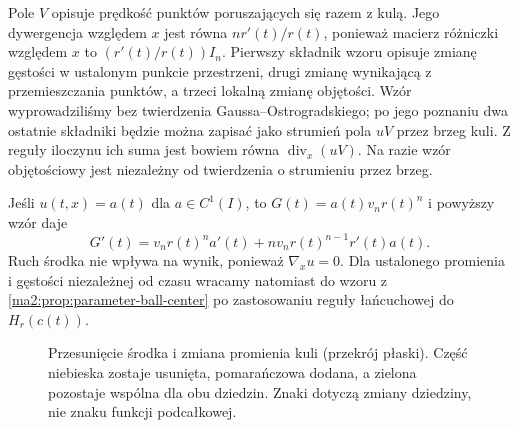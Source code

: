 Pole $V$ opisuje prędkość punktów
poruszających się razem z kulą. Jego
dywergencja względem $x$ jest równa
$nr'(t)/r(t)$, ponieważ macierz różniczki
względem $x$ to $(r'(t)/r(t))I_n$.
Pierwszy składnik wzoru opisuje zmianę
gęstości w ustalonym punkcie przestrzeni,
drugi zmianę wynikającą z przemieszczania
punktów, a trzeci lokalną zmianę objętości.
Wzór wyprowadziliśmy bez twierdzenia
Gaussa--Ostrogradskiego; po jego poznaniu
dwa ostatnie składniki będzie można
zapisać jako strumień pola $uV$ przez
brzeg kuli. Z reguły iloczynu ich suma
jest bowiem równa $\operatorname{div}_x(uV)$.
Na razie wzór objętościowy jest niezależny
od twierdzenia o strumieniu przez brzeg.

\begin{przyklad}
\label{ma2:ex:parameter-ball-all-constant}
Jeśli $u(t,x)=a(t)$ dla $a\in C^1(I)$, to
$G(t)=a(t)v_nr(t)^n$ i powyższy wzór daje
\[
 G'(t)=v_nr(t)^na'(t)
 +nv_nr(t)^{n-1}r'(t)a(t).
\]
Ruch środka nie wpływa na wynik,
ponieważ $\nabla_xu=0$.
Dla ustalonego promienia i gęstości
niezależnej od czasu wracamy natomiast
do wzoru z \ref{ma2:prop:parameter-ball-center}
po zastosowaniu reguły łańcuchowej do
$H_r(c(t))$.
\end{przyklad}

\begin{figure}[htbp]
\centering
{}
\caption{Przesunięcie środka i zmiana promienia
kuli (przekrój płaski). Część niebieska zostaje
usunięta, pomarańczowa dodana, a zielona
pozostaje wspólna dla obu dziedzin.
Znaki dotyczą zmiany dziedziny, nie znaku
funkcji podcałkowej.}
\label{ma2:fig:parameter-moving-ball}
\end{figure}

